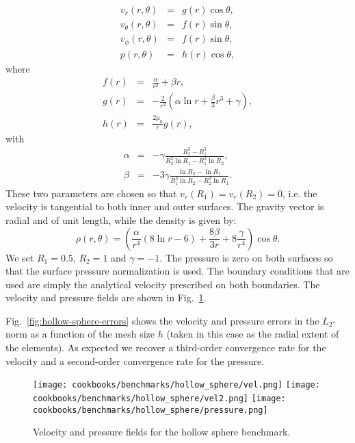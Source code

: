 \documentclass{article}
\begin{document}
\begin{eqnarray}
v_r(r,\theta)      &=& g(r) \cos \theta, \\
v_\theta(r,\theta) &=& f(r) \sin \theta, \\
v_\phi(r,\theta)   &=& f(r) \sin \theta, \\
p(r,\theta)        &=& h(r) \cos \theta ,
\end{eqnarray}
where
\begin{eqnarray}
f(r) &=& \frac{\alpha}{r^2} + \beta r, \\
g(r) &=& -\frac{2}{r^2} \left(  \alpha \ln r + \frac{\beta}{3}  r^3  + \gamma \right),   \\
h(r) &=& \frac{2\mu_0}{r} g(r),
\end{eqnarray}
with
\begin{eqnarray}
\alpha&=&-\gamma \frac{R_2^3-R_1^3}{R_2^3 \ln R_1 - R_1^3 \ln R_2}, \\
\beta &=& -3\gamma \frac{\ln R_2 - \ln R_1  }{R_1^3 \ln R_2 - R_2^3 \ln R_1}.
\end{eqnarray}
These two parameters are chosen so that $v_r(R_1)=v_r(R_2)=0$, i.e.
the velocity is tangential to both inner and outer surfaces.
The gravity vector is radial and of unit length, while the density is given by:
\begin{equation}
\rho(r,\theta)=  \left(   \frac{\alpha}{r^4}  (8 \ln r -6) +  \frac{8\beta}{3r}  +8 \frac{\gamma}{r^4}  \right) \cos\theta.
\end{equation}
We set $R_1=0.5$, $R_2=1$ and $\gamma=-1$. The pressure is zero on both surfaces so that 
the surface pressure normalization is used. The boundary conditions that are used are simply 
the analytical velocity prescribed on both boundaries.
The velocity and pressure fields are shown in Fig.~\ref{fig:hollow-sphere-vp}.

Fig.~\ref{fig:hollow-sphere-errors} shows the
velocity and pressure errors in the $L_2$-norm as a function of the mesh size $h$ (taken in this case
as the radial extent of the elements). As expected we recover a third-order convergence rate for the velocity
and a second-order convergence rate for the pressure.

\begin{figure}
\centering
\texttt{[image: cookbooks/benchmarks/hollow\_sphere/vel.png]}
\texttt{[image: cookbooks/benchmarks/hollow\_sphere/vel2.png]}
\texttt{[image: cookbooks/benchmarks/hollow\_sphere/pressure.png]}
\caption{Velocity and pressure fields for the hollow sphere benchmark.}
\label{fig:hollow-sphere-vp}
\end{figure}
\end{document}
